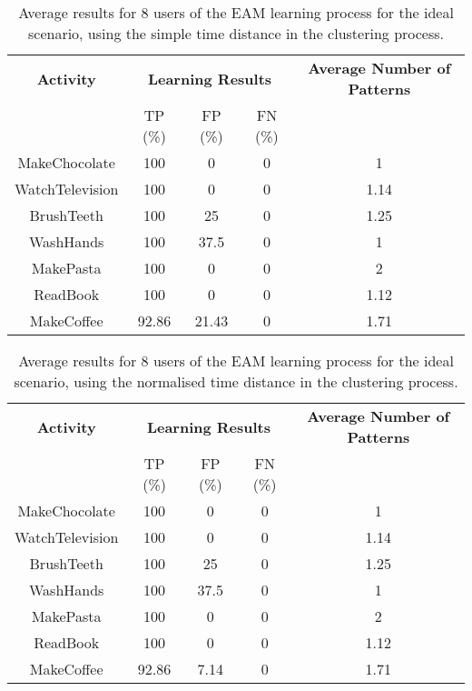 \begin{table}[htbp]\scriptsize
  \begin{center}
        \begin{tabular}{ccccc}
            \hline            
            \textbf{Activity} & \multicolumn{3}{c}{\textbf{Learning Results}} & \textbf{Average Number of Patterns} \\
             & TP (\%) & FP (\%) & FN (\%) & \\             
            \hline
            MakeChocolate   & 100 & 0     & 0  & 1 \\
	    WatchTelevision & 100 & 0     & 0  & 1.14    \\
	    BrushTeeth      & 100 & 25    & 0  & 1.25 \\
	    WashHands       & 100 & 37.5    & 0  & 1 \\
	    MakePasta       & 100 & 0     & 0  & 2 \\
	    ReadBook        & 100 & 0     & 0  & 1.12  \\
	    MakeCoffee      & 92.86 & 21.43     & 0  & 1.71  \\
            \hline
        \end{tabular}
        \caption{Average results for 8 users of the EAM learning process for the ideal scenario, using the simple time distance in the clustering process.}
        \label{tab-rp-ideal-t0}
    \end{center}
\end{table}


\begin{table}[htbp]\scriptsize
  \begin{center}
        \begin{tabular}{ccccc}
            \hline            
            \textbf{Activity} & \multicolumn{3}{c}{\textbf{Learning Results}} & \textbf{Average Number of Patterns} \\
             & TP (\%) & FP (\%) & FN (\%) & \\             
            \hline
            MakeChocolate   & 100 & 0     & 0  & 1 \\
	    WatchTelevision & 100 & 0     & 0  & 1.14    \\
	    BrushTeeth      & 100 & 25    & 0  & 1.25 \\
	    WashHands       & 100 & 37.5    & 0  & 1 \\
	    MakePasta       & 100 & 0     & 0  & 2 \\
	    ReadBook        & 100 & 0     & 0  & 1.12  \\
	    MakeCoffee      & 92.86 & 7.14     & 0  & 1.71  \\
            \hline
        \end{tabular}
        \caption{Average results for 8 users of the EAM learning process for the ideal scenario, using the normalised time distance in the clustering process.}
        \label{tab-rp-ideal-t1}
    \end{center}
\end{table}



